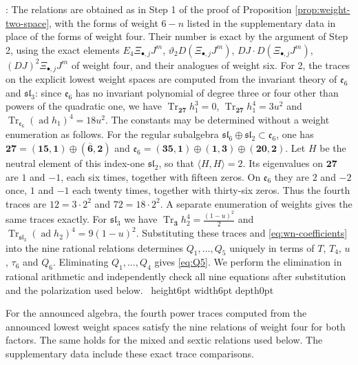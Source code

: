 \documentclass[leqno]{article}
\newcommand{\qed}{\hfill \vrule height6pt  width6pt depth0pt}
\newenvironment{proof}[1][]{\noindent {\it Proof #1} : }{\hbox{~}\qed
\smallskip
}
\numberwithin{equation}{section}
\begin{document}
\begin{proof}
The relations are obtained as in Step 1 of the proof of Proposition \ref{prop:weight-two-space}, with the forms of weight $6-n$ listed in the supplementary data in place of the forms of weight four. Their number is exact by the argument of Step 2, using the exact elements $E_4\Xi_{\bullet,j}J^m$, $\vartheta_2D(\Xi_{\bullet,j}J^m)$, $DJ \cdot D(\Xi_{\bullet,j}J^m)$, $(DJ)^2\Xi_{\bullet,j}J^m$ of weight four, and their analogues of weight six. For 2, the traces on the explicit lowest weight spaces are computed from the invariant theory of $\mathfrak e_6$ and $\mathfrak{sl}_3$: since $\mathfrak e_6$ has no invariant polynomial of degree three or four other than powers of the quadratic one, we have $\operatorname{Tr}_{\mathbf{27}}h_1^3 = 0$, $\operatorname{Tr}_{\mathbf{27}}h_1^4 = 3u^2$ and $\operatorname{Tr}_{\mathfrak e_6}(\operatorname{ad}h_1)^4 = 18u^2$. The constants may be determined without a weight enumeration as follows. For the regular subalgebra $\mathfrak{sl}_6 \oplus \mathfrak{sl}_2 \subset \mathfrak e_6$, one has $\mathbf{27} = (\mathbf{15},\mathbf 1) \oplus (\overline{\mathbf6},\mathbf2)$ and $\mathfrak e_6 = (\mathbf{35},\mathbf1) \oplus (\mathbf1,\mathbf3) \oplus (\mathbf{20},\mathbf2)$. Let $H$ be the neutral element of this index-one $\mathfrak{sl}_2$, so that $\langle H,H\rangle = 2$. Its eigenvalues on $\mathbf{27}$ are $1$ and $-1$, each six times, together with fifteen zeros. On $\mathfrak e_6$ they are $2$ and $-2$ once, $1$ and $-1$ each twenty times, together with thirty-six zeros. Thus the fourth traces are $12 = 3\cdot 2^2$ and $72 = 18\cdot 2^2$. A separate enumeration of weights gives the same traces exactly. For $\mathfrak{sl}_3$ we have $\operatorname{Tr}_{\mathbf 3}h_2^4 = \frac{(1-u)^2}{2}$ and $\operatorname{Tr}_{\mathfrak{sl}_3}(\operatorname{ad}h_2)^4 = 9(1-u)^2$. Substituting these traces and \eqref{eq:wn-coefficients} into the nine rational relations determines $Q_1,\ldots,Q_5$ uniquely in terms of $T$, $T_4$, $u$, $\tau_6$ and $Q_6$. Eliminating $Q_1,\ldots,Q_4$ gives \eqref{eq:Q5}. We perform the elimination in rational arithmetic and independently check all nine equations after substitution and the polarization used below.
\end{proof}

For the announced algebra, the fourth power traces computed from the announced lowest weight spaces satisfy the nine relations of weight four for both factors. The same holds for the mixed and sextic relations used below. The supplementary data include these exact trace comparisons.
\end{document}
